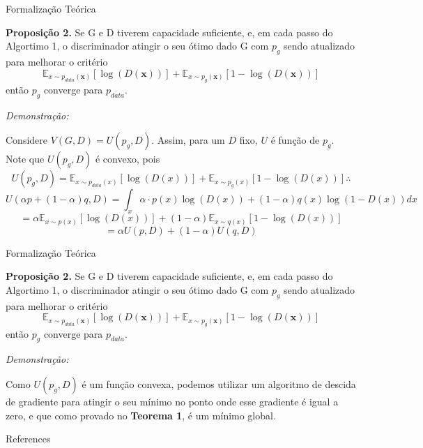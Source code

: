 \documentclass[10pt]{beamer}
\begin{document}
\begin{frame}[fragile]{Formalização Teórica}
	
	\small
	\textbf{Proposição 2.} Se G e D tiverem capacidade suficiente,
	e, em cada passo do Algortimo 1, o discriminador atingir o seu
	ótimo dado G com $p_g$ sendo atualizado para melhorar o critério
    $$
    \mathbb{E}_{x\sim p_{data}(\bm x)}\left[\log{(D(\bm x))}\right]+
    \mathbb{E}_{x\sim p_g(\bm x)}\left[1-\log{(D(\bm x))}\right]
    $$
    então $p_g$ converge para $p_{data}$.

	\textit{Demonstração:}

	Considere $V(G,D) = U(p_g,D)$. Assim, para um $D$ fixo, $U$ é
	função de $p_g$. Note que $U(p_g,D)$ é convexo, pois
	$$ U(p_g,D) = 
    \mathbb{E}_{x\sim p_{data}(x)}\left[\log{(D(x))}\right]+
    \mathbb{E}_{x\sim p_g(x)}\left[1-\log{(D(x))}\right] \therefore
	$$
	\pause
	$$U(\alpha p + (1-\alpha)q,D) = 
	\int_x \alpha\cdot p(x)\log{(D(x))} + (1-\alpha)q(x)\log{(1-D(x))}dx
	$$
	$$
	=
    \alpha\mathbb{E}_{x\sim p(x)}\left[\log{(D(x))}\right]+
    (1-\alpha)\mathbb{E}_{x\sim q(x)}\left[1-\log{(D(x))}\right]
	$$
	$$
	= \alpha U(p,D) + (1-\alpha)U(q,D)
	$$

\end{frame}

\begin{frame}[fragile]{Formalização Teórica}
	
	\small
	\textbf{Proposição 2.} Se G e D tiverem capacidade suficiente,
	e, em cada passo do Algortimo 1, o discriminador atingir o seu
	ótimo dado G com $p_g$ sendo atualizado para melhorar o critério
    $$
    \mathbb{E}_{x\sim p_{data}(\bm x)}\left[\log{(D(\bm x))}\right]+
    \mathbb{E}_{x\sim p_g(\bm x)}\left[1-\log{(D(\bm x))}\right]
    $$
    então $p_g$ converge para $p_{data}$.

	\textit{Demonstração:}

	Como $U(p_g,D)$ é um função convexa, podemos utilizar um algoritmo
	de descida de gradiente para atingir o seu mínimo no ponto
	onde esse gradiente é igual a zero, e que como provado
	no \textbf{Teorema 1}, é um mínimo global.


\end{frame}


\begin{frame}[allowframebreaks]{References}

  \renewcommand{\section}[2]{}%
  
  

\end{frame}
\end{document}
